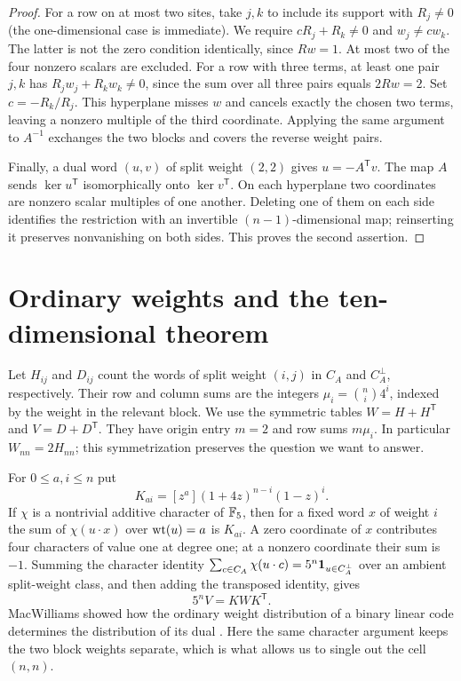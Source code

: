 \begin{proof}
For a row on at most two sites, take $j,k$ to include its support with $R_j\ne0$ (the one-dimensional case is immediate). We require $cR_j+R_k\ne0$ and $w_j\ne c w_k$. The latter is not the zero condition identically, since $Rw=1$. At most two of the four nonzero scalars are excluded. For a row with three terms, at least one pair $j,k$ has $R_j w_j+R_k w_k\ne0$, since the sum over all three pairs equals $2Rw=2$. Set $c=-R_k/R_j$. This hyperplane misses $w$ and cancels exactly the chosen two terms, leaving a nonzero multiple of the third coordinate. Applying the same argument to $A^{-1}$ exchanges the two blocks and covers the reverse weight pairs.

Finally, a dual word $(u,v)$ of split weight $(2,2)$ gives $u=-A^{\mathsf T}v$. The map $A$ sends $\ker u^{\mathsf T}$ isomorphically onto $\ker v^{\mathsf T}$. On each hyperplane two coordinates are nonzero scalar multiples of one another. Deleting one of them on each side identifies the restriction with an invertible $(n-1)$-dimensional map; reinserting it preserves nonvanishing on both sides. This proves the second assertion.
\end{proof}

\section{Ordinary weights and the ten-dimensional theorem}
\label{sec:ordinary}
Let $H_{ij}$ and $D_{ij}$ count the words of split weight $(i,j)$ in $C_A$ and $C_A^\perp$, respectively. Their row and column sums are the integers $\mu_i=\binom ni4^i$, indexed by the weight in the relevant block. We use the symmetric tables $W=H+H^{\mathsf T}$ and $V=D+D^{\mathsf T}$. They have origin entry $m=2$ and row sums $m\mu_i$. In particular $W_{nn}=2H_{nn}$; this symmetrization preserves the question we want to answer.

For $0\le a,i\le n$ put
\[
 K_{ai}=[z^a](1+4z)^{n-i}(1-z)^i.
\]
If $\chi$ is a nontrivial additive character of $\mathbb F_5$, then for a fixed word $x$ of weight $i$ the sum of $\chi(u\cdot x)$ over $\operatorname{wt}(u)=a$ is $K_{ai}$. A zero coordinate of $x$ contributes four characters of value one at degree one; at a nonzero coordinate their sum is $-1$. Summing the character identity
$\sum_{c\in C_A}\chi(u\cdot c)=5^n{\bf1}_{u\in C_A^\perp}$
over an ambient split-weight class, and then adding the transposed identity, gives
\begin{equation}
 5^n V=K W K^{\mathsf T}.
 \label{eq:ordinary-transform}
\end{equation}
MacWilliams showed how the ordinary weight distribution of a binary linear code determines the distribution of its dual \cite{macwilliams}. Here the same character argument keeps the two block weights separate, which is what allows us to single out the cell $(n,n)$.

